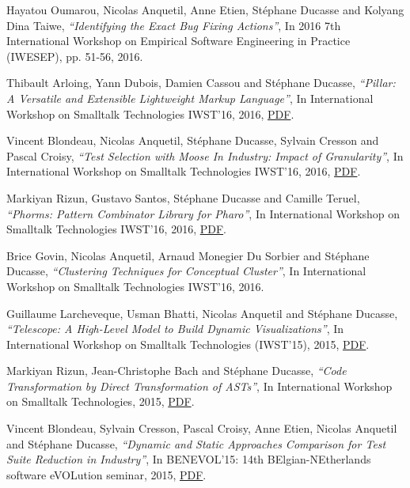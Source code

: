 \documentclass{article}
\newcommand{\czauthors}[1]{#1}
\newcommand{\cztitle}[1]{\emph{``#1''}}
\newcommand{\czbooktitle}[1]{#1}
\begin{document}
\begin{itemize}
	\pub  \czauthors{Hayatou Oumarou, Nicolas Anquetil, Anne Etien, St\'ephane Ducasse and Kolyang Dina Taiwe},  \cztitle{Identifying the Exact Bug Fixing Actions},  In \czbooktitle{2016 7th International Workshop on Empirical Software Engineering in Practice (IWESEP)}, pp. 51-56, 2016.

	\pub  \czauthors{Thibault Arloing, Yann Dubois, Damien Cassou and St\'ephane Ducasse},  \cztitle{Pillar: A Versatile and Extensible Lightweight Markup Language},  In \czbooktitle{International Workshop on Smalltalk Technologies {IWST'16}}, 2016, \href{http://rmod-files.lille.inria.fr/Team/Texts/Papers/Arlo16a-IWST16-Pillar.pdf}{PDF}.

	\pub  \czauthors{Vincent Blondeau, Nicolas Anquetil, St\'ephane Ducasse, Sylvain Cresson and Pascal Croisy},  \cztitle{Test Selection with Moose In Industry: Impact of Granularity},  In \czbooktitle{International Workshop on Smalltalk Technologies {IWST'16}}, 2016, \href{http://rmod-files.lille.inria.fr/Team/Texts/Papers/Blon16b-IWST-TestSelectionWithMoose.pdf}{PDF}.

	\pub  \czauthors{Markiyan Rizun, Gustavo Santos, St\'ephane Ducasse and Camille Teruel},  \cztitle{{Phorms: Pattern Combinator Library for Pharo}},  In \czbooktitle{International Workshop on Smalltalk Technologies {IWST'16}}, 2016, \href{http://rmod-files.lille.inria.fr/Team/Texts/Papers/Rizu16a-IWST16-Matcher.pdf}{PDF}.

	\pub  \czauthors{Brice Govin, Nicolas Anquetil, Arnaud Monegier Du Sorbier and St\'ephane Ducasse},  \cztitle{{Clustering Techniques for Conceptual Cluster}},  In \czbooktitle{International Workshop on Smalltalk Technologies {IWST'16}}, 2016.

	\pub  \czauthors{Guillaume Larcheveque, Usman Bhatti, Nicolas Anquetil and St\'ephane Ducasse},  \cztitle{Telescope: A High-Level Model to Build Dynamic Visualizations},  In \czbooktitle{International Workshop on Smalltalk Technologies (IWST'15)}, 2015, \href{http://rmod-files.lille.inria.fr/Team/Texts/Papers/Larc15a-Telescope-IWST.pdf}{PDF}.

	\pub  \czauthors{Markiyan Rizun, Jean-Christophe Bach and St\'ephane Ducasse},  \cztitle{Code Transformation by Direct Transformation of ASTs},  In \czbooktitle{International Workshop on Smalltalk Technologies}, 2015, \href{http://rmod-files.lille.inria.fr/Team/Texts/Papers/Rizu15a-CodeTransformation.pdf}{PDF}.

	\pub  \czauthors{Vincent Blondeau, Sylvain Cresson, Pascal Croisy, Anne Etien, Nicolas Anquetil and St\'ephane Ducasse},  \cztitle{{Dynamic and Static Approaches Comparison for Test Suite Reduction in Industry}},  In \czbooktitle{{BENEVOL'15: 14th BElgian-NEtherlands software eVOLution seminar}}, 2015, \href{http://rmod-files.lille.inria.fr/Team/Texts/Papers/Blon15c-BENEVOL-TestSuiteReductionComparison.pdf}{PDF}.


\end{itemize}
\end{document}
